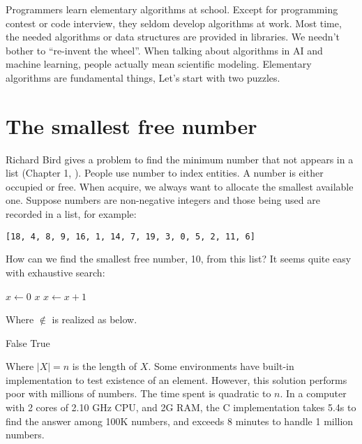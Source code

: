 \documentclass[b5paper]{article}
\begin{document}
Programmers learn elementary algorithms at school. Except for programming contest or code interview, they seldom develop algorithms at work. Most time, the needed algorithms or data structures are provided in libraries. We needn't bother to \enquote{re-invent the wheel}. When talking about algorithms in AI and machine learning, people actually mean scientific modeling. Elementary algorithms are fundamental things, Let's start with two puzzles.

\section*{The smallest free number}
\label{min-free} 

Richard Bird gives a problem to find the minimum number that not appears in a list (Chapter 1, \cite{fp-pearls}). People use number to index entities. A number is either occupied or free. When acquire, we always want to allocate the smallest available one. Suppose numbers are non-negative integers and those being used are recorded in a list, for example:

\begin{Verbatim}[fontsize=\footnotesize]
[18, 4, 8, 9, 16, 1, 14, 7, 19, 3, 0, 5, 2, 11, 6]
\end{Verbatim}

How can we find the smallest free number, 10, from this list? It seems quite easy with exhaustive search:

\begin{algorithmic}[1]
  \State $x \gets 0$
  \Loop
      \State \Return $x$
    \Else
      \State $x \gets x + 1$
    \EndIf
  \EndLoop
\EndFunction
\end{algorithmic}

Where $\notin$ is realized as below.

\begin{algorithmic}[1]
      \State \Return False
    \EndIf
  \EndFor
  \State \Return True
\EndFunction
\end{algorithmic}

Where $|X| = n$ is the length of $X$. Some environments have built-in implementation to test existence of an element. However, this solution performs poor with millions of numbers. The time spent is quadratic to $n$. In a computer with 2 cores of 2.10 GHz CPU, and 2G RAM, the C implementation takes 5.4s to find the answer among 100K numbers, and exceeds 8 minutes to handle 1 million numbers.
\end{document}
